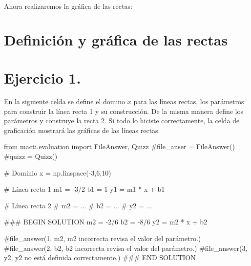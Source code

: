 \documentclass[
  letterpaper,
  DIV=11,
  numbers=noendperiod]{scrreprt}
\newenvironment{Shaded}{\begin{snugshade}}{\end{snugshade}}
\newcommand{\CommentTok}[1]{\textcolor[rgb]{0.37,0.37,0.37}{#1}}
\newcommand{\DecValTok}[1]{\textcolor[rgb]{0.68,0.00,0.00}{#1}}
\newcommand{\ImportTok}[1]{\textcolor[rgb]{0.00,0.46,0.62}{#1}}
\newcommand{\NormalTok}[1]{\textcolor[rgb]{0.00,0.23,0.31}{#1}}
\newcommand{\OperatorTok}[1]{\textcolor[rgb]{0.37,0.37,0.37}{#1}}
\newcommand{\RegionMarkerTok}[1]{\textcolor[rgb]{0.00,0.23,0.31}{#1}}
\begin{document}
Ahora realizaremos la gráfica de las rectas:

\section{Definición y gráfica de las
rectas}\label{definiciuxf3n-y-gruxe1fica-de-las-rectas}

\section{\texorpdfstring{\textbf{Ejercicio
1.}}{Ejercicio 1.}}\label{ejercicio-1.}

En la siguiente celda se define el domino \(x\) para las líneas rectas,
los parámetros para construir la línea recta 1 y su construcción. De la
misma manera define los parámetros y construye la recta 2. Si todo lo
hiciste correctamente, la celda de graficación mostrará las gráficas de
las líneas rectas.

\begin{Shaded}
\begin{Highlighting}[]
\ImportTok{from}\NormalTok{ macti.evaluation }\ImportTok{import}\NormalTok{ FileAnswer, Quizz}
\CommentTok{\#file\_anser = FileAnswer()}
\CommentTok{\#quizz = Quizz()}
\end{Highlighting}
\end{Shaded}

\begin{Shaded}
\begin{Highlighting}[]
\CommentTok{\# Dominio}
\NormalTok{x }\OperatorTok{=}\NormalTok{ np.linspace(}\OperatorTok{{-}}\DecValTok{3}\NormalTok{,}\DecValTok{6}\NormalTok{,}\DecValTok{10}\NormalTok{)}

\CommentTok{\# Línea recta 1}
\NormalTok{m1 }\OperatorTok{=} \OperatorTok{{-}}\DecValTok{3}\OperatorTok{/}\DecValTok{2}
\NormalTok{b1 }\OperatorTok{=} \DecValTok{1}
\NormalTok{y1 }\OperatorTok{=}\NormalTok{ m1 }\OperatorTok{*}\NormalTok{ x }\OperatorTok{+}\NormalTok{ b1}

\CommentTok{\# Línea recta 2}
\CommentTok{\# m2 = ...}
\CommentTok{\# b2 = ...}
\CommentTok{\# y2 = ...}

\CommentTok{\#\#\# }\RegionMarkerTok{BEGIN}\CommentTok{ SOLUTION}
\NormalTok{m2 }\OperatorTok{=} \OperatorTok{{-}}\DecValTok{2}\OperatorTok{/}\DecValTok{6}
\NormalTok{b2 }\OperatorTok{=} \OperatorTok{{-}}\DecValTok{8}\OperatorTok{/}\DecValTok{6}
\NormalTok{y2 }\OperatorTok{=}\NormalTok{ m2 }\OperatorTok{*}\NormalTok{ x }\OperatorTok{+}\NormalTok{ b2}

\CommentTok{\#file\_answer(\textquotesingle{}1\textquotesingle{}, m2, \textquotesingle{}m2 incorrecta revisa el valor del parámetro.\textquotesingle{})}
\CommentTok{\#file\_answer(\textquotesingle{}2\textquotesingle{}, b2, \textquotesingle{}b2 incorrecta revisa el valor del parámetro.\textquotesingle{})}
\CommentTok{\#file\_answer(\textquotesingle{}3\textquotesingle{}, y2, \textquotesingle{}y2 no está definida correctamente.\textquotesingle{})}
\CommentTok{\#\#\# }\RegionMarkerTok{END}\CommentTok{ SOLUTION}
\end{Highlighting}
\end{Shaded}
\end{document}
